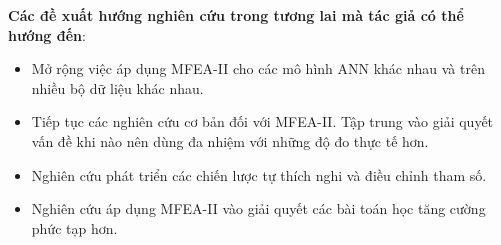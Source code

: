 \textbf{Các đề xuất hướng nghiên cứu trong tương lai mà tác giả có thể hướng đến}:
\begin{itemize}
    \item Mở rộng việc áp dụng MFEA-II cho các mô hình ANN khác nhau
và trên nhiều bộ dữ liệu khác nhau.
    \item Tiếp tục các nghiên cứu cơ bản đối với MFEA-II. Tập trung vào
giải quyết vấn đề khi nào nên dùng đa nhiệm với những độ đo thực tế hơn.
    \item Nghiên cứu phát triển các chiến lược tự thích nghi và điều chỉnh tham số.
    \item Nghiên cứu áp dụng MFEA-II vào giải quyết các bài toán học tăng cường phức tạp hơn.
\end{itemize}